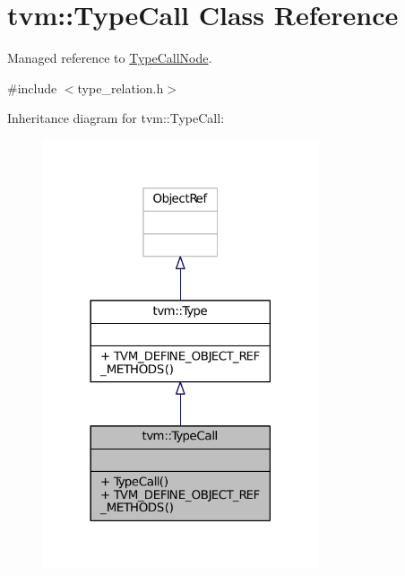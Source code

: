 \hypertarget{classtvm_1_1TypeCall}{}\section{tvm\+:\+:Type\+Call Class Reference}
\label{classtvm_1_1TypeCall}


Managed reference to \hyperlink{classtvm_1_1TypeCallNode}{Type\+Call\+Node}.  




{\ttfamily \#include $<$type\+\_\+relation.\+h$>$}



Inheritance diagram for tvm\+:\+:Type\+Call\+:
\nopagebreak
\begin{figure}[H]
\begin{center}
\leavevmode
\includegraphics[width=230pt]{classtvm_1_1TypeCall__inherit__graph}
\end{center}
\end{figure}


